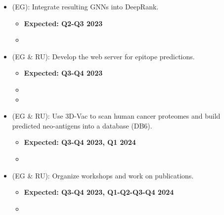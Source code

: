 \begin{enumerate}[start=0,leftmargin=.7in,label={\bfseries \ding{118} Task \arabic*:}]
\begin{itemize}
        \item (EG): Integrate resulting GNNs into DeepRank.
        \begin{itemize}
            \item \textbf{Expected: Q2-Q3 2023}
            \item {}
        \end{itemize}
        \item (EG \& RU): Develop the web server for epitope predictions.
        \begin{itemize}
            \item \textbf{Expected: Q3-Q4 2023}
            \item {}
            \item {}
        \end{itemize}
        \item (EG \& RU): Use 3D-Vac to scan human cancer proteomes and build predicted neo-antigens into a database (DB6).
        \begin{itemize}
            \item \textbf{Expected: Q3-Q4 2023, Q1 2024}
            \item {}
        \end{itemize}
        \item (EG \& RU): Organize workshops and work on publications.
        \begin{itemize}
            \item \textbf{Expected: Q3-Q4 2023, Q1-Q2-Q3-Q4 2024}
            \item {}
        \end{itemize}
    \end{itemize}
\end{enumerate}
%
